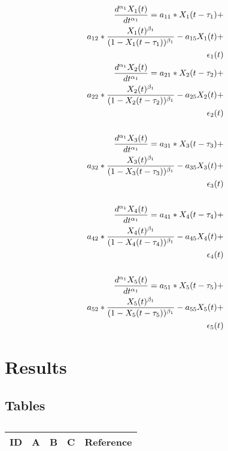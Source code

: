 \begin{align*} 
\tiny
\frac{d^{\alpha_1}X_1(t)}{dt^{\alpha_1}} = a_{11} *X_1(t - \tau_1) + \\
a_{12} *\frac{X_1(t)^{\beta_1}}{(1-X_1(t - \tau_1))^{\beta_1}} - a_{15}X_1(t) + \\
\epsilon_1(t) \\
\frac{d^{\alpha_1}X_2(t)}{dt^{\alpha_1}} = a_{21} *X_2(t - \tau_2) + \\
a_{22} *\frac{X_2(t)^{\beta_1}}{(1-X_2(t - \tau_2))^{\beta_1}} - a_{25}X_2(t) + \\
\epsilon_2(t) \\ \\
\frac{d^{\alpha_1}X_3(t)}{dt^{\alpha_1}} = a_{31} *X_3(t - \tau_3) + \\
a_{32} *\frac{X_3(t)^{\beta_1}}{(1-X_3(t - \tau_3))^{\beta_1}} - a_{35}X_3(t) + \\
\epsilon_3(t) \\ \\
\frac{d^{\alpha_1}X_4(t)}{dt^{\alpha_1}} = a_{41} *X_4(t - \tau_4) + \\
a_{42} *\frac{X_4(t)^{\beta_1}}{(1-X_4(t - \tau_4))^{\beta_1}} - a_{45}X_4(t) + \\
\epsilon_4(t) \\ \\
\frac{d^{\alpha_1}X_5(t)}{dt^{\alpha_1}} = a_{51} *X_5(t - \tau_5) + \\
a_{52} *\frac{X_5(t)^{\beta_1}}{(1-X_5(t - \tau_5))^{\beta_1}} - a_{55}X_5(t) + \\
\epsilon_5(t) \\
\end{align*}



\section{Results}


\subsection{Tables}

\centering
\begin{table}[H]\footnotesize
	\caption{}
	\begin{tabular}{rp{1cm}p{2cm}p{3cm}p{1cm}}
		\hline
		ID & A & B & C & Reference \\
		\hline
		\hline
	\end{tabular}
\end{table}
\raggedright

